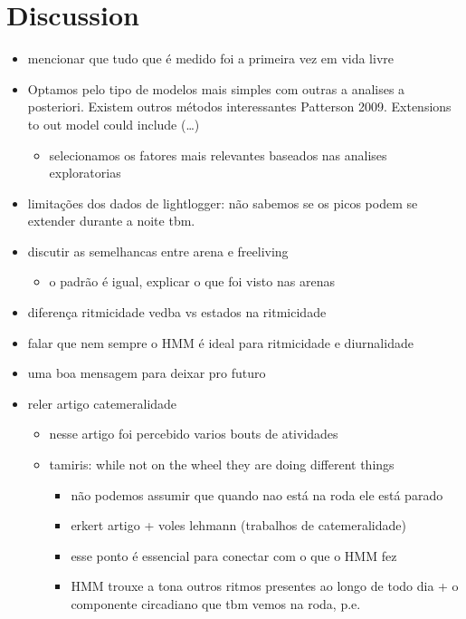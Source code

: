 \documentclass[english,msc,numbers,hidelinks]{coppe}
\providecommand{\tightlist}{%
  \setlength{\itemsep}{0pt}\setlength{\parskip}{0pt}}
\begin{document}
  \hypertarget{discussion}{%
  \section{Discussion}\label{discussion}}
  \begin{itemize}
  \item
    mencionar que tudo que é medido foi a primeira vez em vida livre
  \item
    Optamos pelo tipo de modelos mais simples com outras a analises a posteriori. Existem outros métodos interessantes Patterson 2009. Extensions to out model could include (\ldots)
    \begin{itemize}
    \tightlist
    \item
      selecionamos os fatores mais relevantes baseados nas analises exploratorias
    \end{itemize}
  \item
    limitações dos dados de lightlogger: não sabemos se os picos podem se extender durante a noite tbm.
  \item
    discutir as semelhancas entre arena e freeliving
    \begin{itemize}
    \tightlist
    \item
      o padrão é igual, explicar o que foi visto nas arenas
    \end{itemize}
  \item
    diferença ritmicidade vedba vs estados na ritmicidade
  \item
    falar que nem sempre o HMM é ideal para ritmicidade e diurnalidade
  \item
    uma boa mensagem para deixar pro futuro
  \item
    reler artigo catemeralidade
    \begin{itemize}
    \item
      nesse artigo foi percebido varios bouts de atividades
    \item
      tamiris: while not on the wheel they are doing different things
      \begin{itemize}
      \tightlist
      \item
        não podemos assumir que quando nao está na roda ele está parado
      \item
        erkert artigo + voles lehmann (trabalhos de catemeralidade)
      \item
        esse ponto é essencial para conectar com o que o HMM fez
      \item
        HMM trouxe a tona outros ritmos presentes ao longo de todo dia + o componente circadiano que tbm vemos na roda, p.e.

\end{itemize}
\end{itemize}
\end{itemize}
\end{document}
